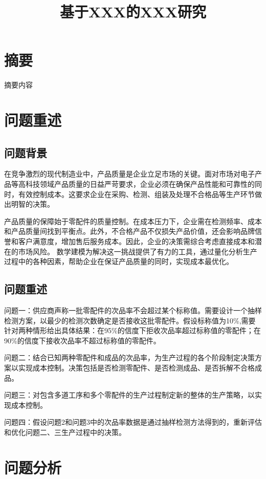 \documentclass[withoutpreface,bwprint]{cumcmthesis}
\title{基于XXX的XXX研究}
\begin{document}
\maketitle


\section{摘要}
摘要内容

\section{问题重述}
\subsection{问题背景}
在竞争激烈的现代制造业中，产品质量是企业立足市场的关键。面对市场对电子产品等高科技领域产品质量的日益严苛要求，企业必须在确保产品性能和可靠性的同时，有效控制成本。这要求企业在采购、检测、组装及处理不合格品等生产环节做出明智的决策。

产品质量的保障始于零配件的质量控制。在成本压力下，企业需在检测频率、成本和产品质量间找到平衡点。此外，不合格产品不仅损失产品价值，还会影响品牌信誉和客户满意度，增加售后服务成本。因此，企业的决策需综合考虑直接成本和潜在的市场风险。
数学建模为解决这一挑战提供了有力的工具，通过量化分析生产过程中的各种因素，帮助企业在保证产品质量的同时，实现成本最优化。

\subsection{问题重述}
问题一：供应商声称一批零配件的次品率不会超过某个标称值。需要设计一个抽样检测方案，以最少的检测次数确定是否接收这批零配件。假设标称值为10\%,需要针对两种情形给出具体结果：在95\%的信度下拒收次品率超过标称值的零配件；在90\%的信度下接收次品率不超过标称值的零配件。

问题二：结合已知两种零配件和成品的次品率，为生产过程的各个阶段制定决策方案以实现成本控制。决策包括是否检测零配件、是否检测成品、是否拆解不合格成品。

问题三：对包含多道工序和多个零配件的生产过程制定新的整体的生产策略，以实现成本控制。

问题四：假设问题2和问题3中的次品率数据是通过抽样检测方法得到的，重新评估和优化问题二、三生产过程中的决策。

\section{问题分析}
\end{document}
